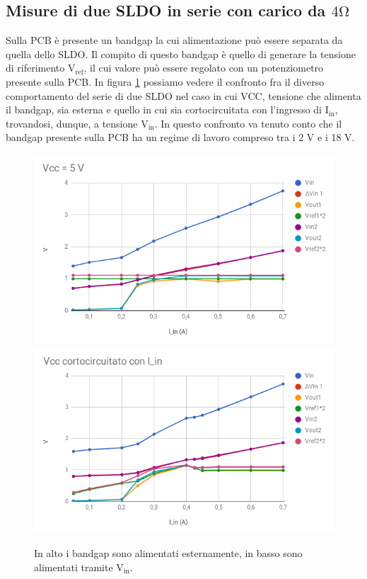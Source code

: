 \subsection{Misure di due SLDO in serie con carico da $\mathrm{4 \Omega}$}
\label{342}
Sulla PCB è presente un bandgap la cui alimentazione può essere separata da quella dello SLDO. Il compito di questo bandgap è quello di generare la tensione di riferimento $\mathrm{V_{ref}}$, il cui valore può essere regolato con un potenziometro presente sulla PCB.
In figura \ref{SLDO5Serie} possiamo vedere il confronto fra il diverso comportamento del serie di due SLDO nel caso in cui VCC, tensione che alimenta il bandgap, sia esterna e quello in cui sia cortocircuitata con l'ingresso di $\mathrm{I_{in}}$, trovandosi, dunque, a tensione $\mathrm{V_{in}}$.
In questo confronto va tenuto conto che il bandgap presente sulla PCB ha un regime di lavoro compreso tra i 2 V e i 18 V. 
\begin{figure}
\centering
\includegraphics[width=.85\textwidth]{Immagini/SLDO5Serie1}
\includegraphics[width=.85\textwidth]{Immagini/SLDO5Serie2}
\caption{In alto i bandgap sono alimentati esternamente, in basso sono alimentati tramite $\mathrm{V_{in}}$.}
\label{SLDO5Serie}
\end{figure}
